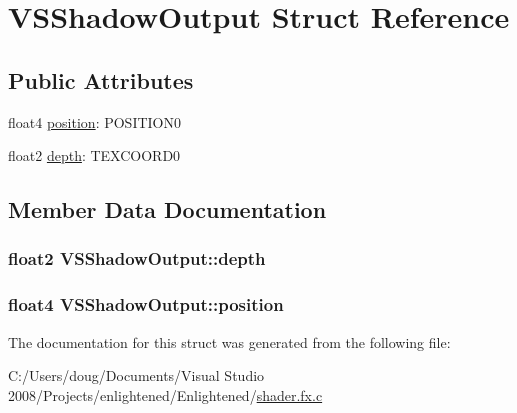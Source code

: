 \hypertarget{struct_v_s_shadow_output}{
\section{VSShadowOutput Struct Reference}
\label{struct_v_s_shadow_output}
}
\subsection*{Public Attributes}
\begin{DoxyCompactItemize}
\item 
float4 \hyperlink{struct_v_s_shadow_output_a4dcaee159fb71a5dc0d04ecf5ac5547c}{position}: POSITION0
\item 
float2 \hyperlink{struct_v_s_shadow_output_ae4e794d810f3429f9c2dbcb277b9fbbb}{depth}: TEXCOORD0
\end{DoxyCompactItemize}


\subsection{Member Data Documentation}
\hypertarget{struct_v_s_shadow_output_ae4e794d810f3429f9c2dbcb277b9fbbb}{
\subsubsection[{depth}]{\setlength{\rightskip}{0pt plus 5cm}float2 {\bf VSShadowOutput::depth}}}
\label{struct_v_s_shadow_output_ae4e794d810f3429f9c2dbcb277b9fbbb}
\hypertarget{struct_v_s_shadow_output_a4dcaee159fb71a5dc0d04ecf5ac5547c}{
\subsubsection[{position}]{\setlength{\rightskip}{0pt plus 5cm}float4 {\bf VSShadowOutput::position}}}
\label{struct_v_s_shadow_output_a4dcaee159fb71a5dc0d04ecf5ac5547c}


The documentation for this struct was generated from the following file:\begin{DoxyCompactItemize}
\item 
C:/Users/doug/Documents/Visual Studio 2008/Projects/enlightened/Enlightened/\hyperlink{shader_8fx_8c}{shader.fx.c}\end{DoxyCompactItemize}
